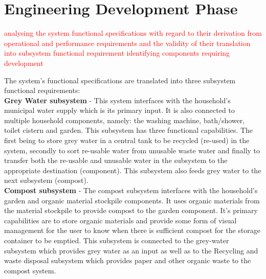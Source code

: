 \documentclass[a4paper,11pt,fleqn]{report}
\begin{document}
\chapter{Engineering Development Phase}
\textcolor{red}{analysing the system functional specifications with regard to their derivation from operational and performance requirements and the validity of their translation into subsystem functional requirement identifying components requiring development}

The system's functional specifications are translated into three subsystem functional requirements:\\

\textbf{Grey Water subsystem} - This system interfaces with the household's municipal water supply which is its primary input. It is also connected to multiple household components, namely: the washing machine, bath/shower, toilet cistern and garden. This subsystem has three functional capabilities. The first being to store grey water in a central tank to be recycled (re-used) in the system, secondly to sort re-usable water from unusable waste water and finally to transfer both the re-usable and unusable water in the subsystem to the appropriate destination (component). This subsystem also feeds grey water to the next subsystem (compost).\\

\textbf{Compost subsystem} -  The compost subsystem interfaces with the household's garden and organic material stockpile components. It uses organic materials from the material stockpile to provide compost to the garden component. It's primary capabilities are to store organic materials and provide some form of visual management for the user to know when there is sufficient compost for the storage container to be emptied. This subsystem is connected to the grey-water subsystem which provides grey water as an input as well as to the Recycling and waste disposal subsystem which provides paper and other organic waste to the compost system.\\
\end{document}
